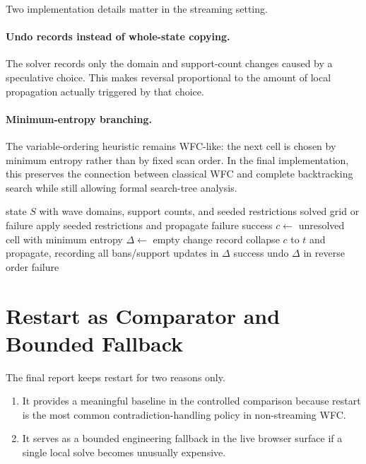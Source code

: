 \documentclass[12pt,a4paper]{report}
\begin{document}
Two implementation details matter in the streaming setting.

\paragraph{Undo records instead of whole-state copying.} The solver records only the domain and support-count changes caused by a speculative choice. This makes reversal proportional to the amount of local propagation actually triggered by that choice.

\paragraph{Minimum-entropy branching.} The variable-ordering heuristic remains WFC-like: the next cell is chosen by minimum entropy rather than by fixed scan order. In the final implementation, this preserves the connection between classical WFC and complete backtracking search while still allowing formal search-tree analysis.

\begin{algorithm}[H]
\caption{Backtracking WFC with Undo Records}
\begin{algorithmic}[1]
\Require state $S$ with wave domains, support counts, and seeded restrictions
\Ensure solved grid or failure
\State apply seeded restrictions and propagate
 \State \Return failure \EndIf
\State \Return {}
    \State \Return success
  \EndIf
  \State $c \gets$ unresolved cell with minimum entropy
    \State $\Delta \gets$ empty change record
    \State collapse $c$ to $t$ and propagate, recording all bans/support updates in $\Delta$
      \State \Return success
    \EndIf
    \State undo $\Delta$ in reverse order
  \EndFor
  \State \Return failure
\EndFunction
\end{algorithmic}
\end{algorithm}

\section{Restart as Comparator and Bounded Fallback}
The final report keeps restart for two reasons only.
\begin{enumerate}
\item It provides a meaningful baseline in the controlled comparison because restart is the most common contradiction-handling policy in non-streaming WFC.
\item It serves as a bounded engineering fallback in the live browser surface if a single local solve becomes unusually expensive.
\end{enumerate}
\end{document}
